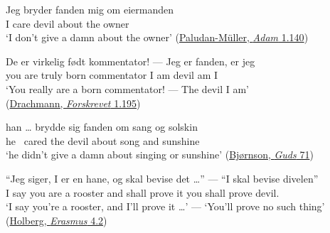 \ex
\gll Jeg bryder fanden mig om eiermanden\\
 I care devil about the owner\\
\glt `I don't give a damn about the owner'
\hfill(\href{https://books.google.co.jp/books?id=Hm4AAAAAcAAJ&pg=PA142&lpg=PA142&dq=\%22Du+bryder+dig+jo+feil+om+eiermanden\%22&source=bl&ots=OGEV9PHatE&sig=ACfU3U2KQkFsep5hS2e4GQEaQuD8F6EYOw&hl=en&sa=X&ved=2ahUKEwjv9NSwu8-EAxV4hlYBHadyCAQQ6AF6BAgIEAM#v=onepage&q=\%22Jeg%20bryder%20fanden\%22&f=false}{Paludan-Müller, \textit{Adam} 1.140}) 

\ex
\gll De er virkelig født kommentator! --- Jeg er fanden, er jeg\\
 you are truly born commentator {} I am devil am I\\
\glt `You really are a born commentator! --- The devil I am'\\
\hfill(\href{https://tekster.kb.dk/text/adl-texts-drachmann14val-root#s144}{Drachmann, \textit{Forskrevet} 1.195})

\ex 
\gll han {\dots} brydde sig fanden om sang og solskin\\
 he {} \ cared the devil about song and sunshine\\
\glt `he didn't give a damn about singing or sunshine'
\hfill(\href{https://www.nb.no/items/URN:NBN:no-nb_digibok_2008072810004?searchText=%22brydde%20sig%20fanden\%22&page=81}{Bjørnson, \textit{Guds} 71}) %
\z
\z


\ea \label{ex:04-219}
\gll ``Jeg siger, I er en hane, og skal bevise {det {\dots}''} --- ``I skal bevise divelen''\\ %
 I say you are a rooster and shall prove it {} you shall prove devil.\DEF{}\\
\glt `I say you're a rooster, and I'll prove it {\dots}' --- `You'll prove no such thing'
\\\hfill(\href{http://holbergsskrifter.dk/holberg-public/view?docId=skuespill%2FErasmus%2FErasmus.page&brand=&chunk.id=act4sc2&toc.id=act4&toc.depth=1}{Holberg, \textit{Erasmus} 4.2}) %
\z


